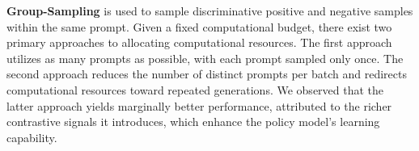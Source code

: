 \textbf{Group-Sampling} is used to sample discriminative positive and negative samples within the same prompt. 
Given a fixed computational budget, there exist two primary approaches to allocating computational resources. The first approach utilizes as many prompts as possible, with each prompt sampled only once. The second approach reduces the number of distinct prompts per batch and redirects computational resources toward repeated generations. We observed that the latter approach yields marginally better performance, attributed to the richer contrastive signals it introduces, which enhance the policy model’s learning capability.
